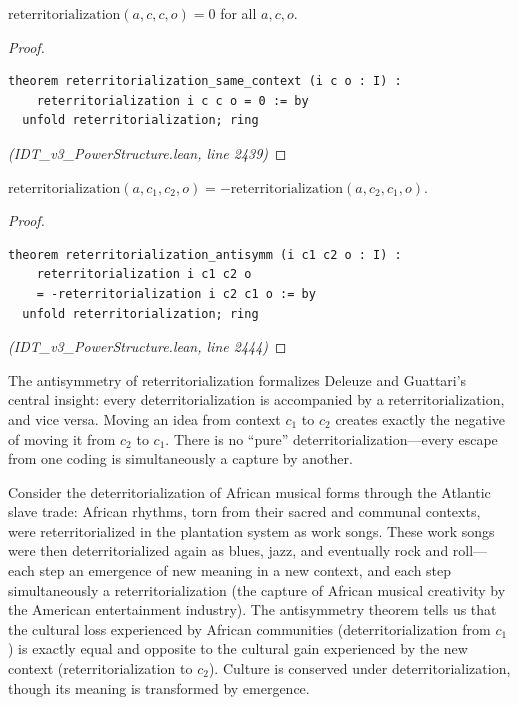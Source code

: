 \begin{theorem}
\label{thm:reterrit-same}
$\mathrm{reterritorialization}(a, c, c, o) = 0$ for all $a, c, o$.
\end{theorem}

\begin{proof}
\begin{lstlisting}
theorem reterritorialization_same_context (i c o : I) :
    reterritorialization i c c o = 0 := by
  unfold reterritorialization; ring
\end{lstlisting}
\textit{(IDT\_v3\_PowerStructure.lean, line 2439)}
\end{proof}

\begin{theorem}
\label{thm:reterrit-antisymm}
$\mathrm{reterritorialization}(a, c_1, c_2, o) = -\mathrm{reterritorialization}(a, c_2, c_1, o)$.
\end{theorem}

\begin{proof}
\begin{lstlisting}
theorem reterritorialization_antisymm (i c1 c2 o : I) :
    reterritorialization i c1 c2 o
    = -reterritorialization i c2 c1 o := by
  unfold reterritorialization; ring
\end{lstlisting}
\textit{(IDT\_v3\_PowerStructure.lean, line 2444)}
\end{proof}

\begin{interpretation}
The antisymmetry of reterritorialization formalizes Deleuze and Guattari's
central insight: every deterritorialization is accompanied by a
reterritorialization, and vice versa. Moving an idea from context $c_1$ to
$c_2$ creates exactly the negative of moving it from $c_2$ to $c_1$. There
is no ``pure'' deterritorialization---every escape from one coding is
simultaneously a capture by another.

Consider the deterritorialization of African musical forms through the
Atlantic slave trade: African rhythms, torn from their sacred and communal
contexts, were reterritorialized in the plantation system as work songs.
These work songs were then deterritorialized again as blues, jazz, and
eventually rock and roll---each step an emergence of new meaning in a new
context, and each step simultaneously a reterritorialization (the capture
of African musical creativity by the American entertainment industry).
The antisymmetry theorem tells us that the cultural loss experienced by
African communities (deterritorialization from $c_1$) is exactly equal and
opposite to the cultural gain experienced by the new context
(reterritorialization to $c_2$). Culture is conserved under
deterritorialization, though its meaning is transformed by emergence.
\end{interpretation}

